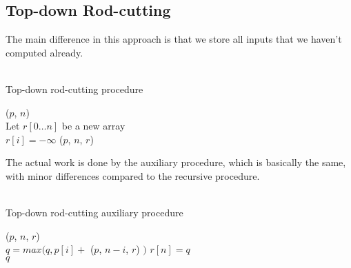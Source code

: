 \newpage
\subsection{Top-down Rod-cutting}
The main difference in this approach is that we store all inputs that we
haven't computed already. \\\\
\begin{algorithm}[H]
	\caption{Top-down rod-cutting procedure}
	\label{alg:cut-rod|type:memoized}
	
	
	
	
	\BlankLine
	\MemoizedCutRod($p$, $n$) \\
	\Begin
	{
		Let $r[0 \dots n]$ be a new array \\
		{
			$r[i] = -\infty$
		}
		\Return \MemoizedCutRodAux($p$, $n$, $r$)
	}
\end{algorithm}
The actual work is done by the auxiliary procedure, which is basically the
same, with minor differences compared to the recursive procedure. \\\\
\begin{algorithm}[H]
	\caption{Top-down rod-cutting auxiliary procedure}
	\label{alg:cut-rod|type:auxiliary}
	
	
	
	
	\BlankLine
	\MemoizedCutRodAux($p$, $n$, $r$) \\
	\Begin
	{
		{
			$q = max(q, p[i] + $ \MemoizedCutRodAux($p$, $n-i$, $r$) $)$
		}
		$r[n] = q$ \\
		\Return $q$
	}
\end{algorithm}

